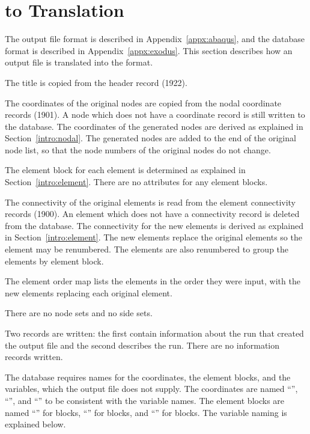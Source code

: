 \chapter{ to  Translation} \label{chap:trans}

The  output file format is described in
Appendix~\ref{appx:abaqus}, and the  database format is
described in Appendix~\ref{appx:exodus}. This section describes how an
 output file is translated into the  format.

The  title is copied from the  header record
(1922).

The coordinates of the original nodes are copied from the 
nodal coordinate records (1901). A node which does not have a coordinate
record is still written to the  database.
The coordinates of the generated nodes
are derived as explained in Section~\ref{intro:nodal}.
The generated nodes are added to the end of
the original node list, so that the node numbers of the original nodes
do not change.

The element block for each element is determined as explained in
Section~\ref{intro:element}.
There are no attributes for any element blocks.

The connectivity of the original elements is read from the  element
connectivity records (1900).
An element which does not have a connectivity record is deleted from the
 database.
The connectivity for the new elements is derived as explained in Section~\ref{intro:element}.
The new elements replace the original
elements so the element may be renumbered.
The elements are also renumbered to group the
elements by element block.

The element order map lists the elements in the order they were input,
with the new elements replacing each original element.

There are no node sets and no side sets.

Two  records are written: the first contain information about
the  run that created the output file and the second
describes the \caps{\PROGRAM} run. There are no information records
written.

The  database requires names for the coordinates, the
element blocks, and the variables, which the  output file does
not supply.
The coordinates are named ``'', ``'', and
``'' to be consistent with the variable names.
The element blocks are named ``'' for  blocks,
``'' for  blocks, and ``'' for  blocks.
The variable naming is explained below.

